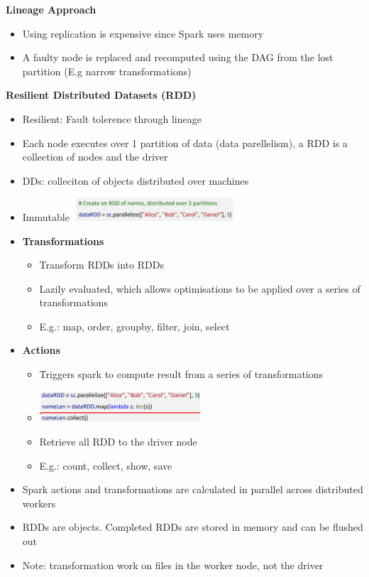 \documentclass[10pt, landscape]{article}
\begin{document}
\begin{multicols}{4}
\textbf{Lineage Approach}
\begin{itemize}
  \item Using replication is expensive since Spark uses memory
  \item A faulty node is replaced and recomputed using the DAG from the lost partition (E.g narrow transformations)
\end{itemize}

\textbf{Resilient Distributed Datasets (RDD)}
\begin{itemize}
  \item Resilient: Fault tolerence through lineage 
  \item Each node executes over 1 partition of data (data parellelism), a RDD is a collection of nodes and the driver
  \item DDs: colleciton of objects distributed over machines
  \item Immutable
  \includegraphics*[width=6cm]{rdd1}
  \item \textbf{Transformations}
  \begin{itemize}
    \item Transform RDDs into RDDs
    \item Lazily evaluated, which allows optimisations to be applied over a series of transformations
    \item E.g.: map, order, groupby, filter, join, select 
  \end{itemize}
  \item \textbf{Actions}
  \begin{itemize}
    \item Triggers spark to compute result from a series of transformations 
    \item \includegraphics*[width=6cm]{rdd2}
    \item Retrieve all RDD to the driver node 
    \item E.g.: count, collect, show, save
  \end{itemize}
  \item Spark actions and transformations are calculated in parallel across distributed workers
  \item RDDs are objects. Completed RDDs are stored in memory and can be flushed out 
  \item Note: transformation work on files in the worker node, not the driver
\end{itemize}


\end{multicols}
\end{document}
